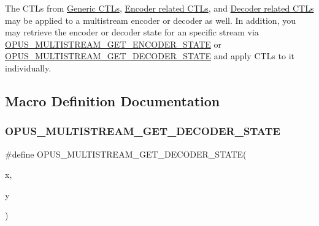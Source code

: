 The C\+T\+Ls from \hyperlink{group__opus__genericctls}{Generic C\+T\+Ls}, \hyperlink{group__opus__encoderctls}{Encoder related C\+T\+Ls}, and \hyperlink{group__opus__decoderctls}{Decoder related C\+T\+Ls} may be applied to a multistream encoder or decoder as well. In addition, you may retrieve the encoder or decoder state for an specific stream via \hyperlink{group__opus__multistream__ctls_ga4e67607eb691c4314a5de90d8c58aff0}{O\+P\+U\+S\+\_\+\+M\+U\+L\+T\+I\+S\+T\+R\+E\+A\+M\+\_\+\+G\+E\+T\+\_\+\+E\+N\+C\+O\+D\+E\+R\+\_\+\+S\+T\+A\+TE} or \hyperlink{group__opus__multistream__ctls_gaf0843831519b4d9b9d73391afef04a53}{O\+P\+U\+S\+\_\+\+M\+U\+L\+T\+I\+S\+T\+R\+E\+A\+M\+\_\+\+G\+E\+T\+\_\+\+D\+E\+C\+O\+D\+E\+R\+\_\+\+S\+T\+A\+TE} and apply C\+T\+Ls to it individually. 

\subsection{Macro Definition Documentation}
\mbox{\label{group__opus__multistream__ctls_gaf0843831519b4d9b9d73391afef04a53}} 
\subsubsection{\texorpdfstring{O\+P\+U\+S\+\_\+\+M\+U\+L\+T\+I\+S\+T\+R\+E\+A\+M\+\_\+\+G\+E\+T\+\_\+\+D\+E\+C\+O\+D\+E\+R\+\_\+\+S\+T\+A\+TE}{OPUS\_MULTISTREAM\_GET\_DECODER\_STATE}}
{\footnotesize\ttfamily \#define O\+P\+U\+S\+\_\+\+M\+U\+L\+T\+I\+S\+T\+R\+E\+A\+M\+\_\+\+G\+E\+T\+\_\+\+D\+E\+C\+O\+D\+E\+R\+\_\+\+S\+T\+A\+TE(\begin{DoxyParamCaption}\item[{}]{x,  }\item[{}]{y }\end{DoxyParamCaption})}



